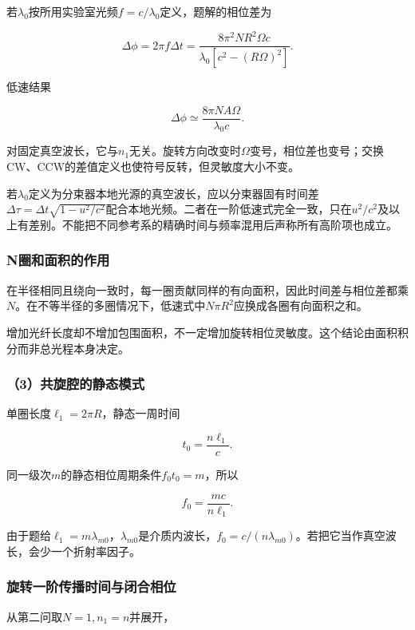 \documentclass[12pt,a4paper,fontset=fandol]{ctexart}
\begin{document}
若\(\lambda_0\)按所用实验室光频\(f=c/\lambda_0\)定义，题解的相位差为

\[
\boxed{
\Delta\phi=2\pi f\Delta t
=\frac{8\pi^2NR^2\Omega c}
{\lambda_0[c^2-(R\Omega)^2]}}.
\]

低速结果

\[
\boxed{
\Delta\phi\simeq
\frac{8\pi N A\Omega}{\lambda_0c}}.
\]

对固定真空波长，它与\(n_1\)无关。旋转方向改变时\(\Omega\)变号，相位差也变号；交换CW、CCW的差值定义也使符号反转，但灵敏度大小不变。

若\(\lambda_0\)定义为分束器本地光源的真空波长，应以分束器固有时间差\(\Delta\tau=\Delta t\sqrt{1-u^2/c^2}\)配合本地光频。二者在一阶低速式完全一致，只在\(u^2/c^2\)及以上有差别。不能把不同参考系的精确时间与频率混用后声称所有高阶项也成立。

\subsubsection{N圈和面积的作用}\label{nux5708ux548cux9762ux79efux7684ux4f5cux7528}

在半径相同且绕向一致时，每一圈贡献同样的有向面积，因此时间差与相位差都乘\(N\)。在不等半径的多圈情况下，低速式中\(N\pi R^2\)应换成各圈有向面积之和。

增加光纤长度却不增加包围面积，不一定增加旋转相位灵敏度。这个结论由面积积分而非总光程本身决定。

\subsubsection{（3）共旋腔的静态模式}\label{ux5171ux65cbux8154ux7684ux9759ux6001ux6a21ux5f0f}

单圈长度\(\ell_1=2\pi R\)，静态一周时间

\[
t_0=\frac{n\ell_1}{c}.
\]

同一级次\(m\)的静态相位周期条件\(f_0t_0=m\)，所以

\[
f_0=\frac{mc}{n\ell_1}.
\]

由于题给\(\ell_1=m\lambda_{m0}\)，\(\lambda_{m0}\)是介质内波长，\(f_0=c/(n\lambda_{m0})\)。若把它当作真空波长，会少一个折射率因子。

\subsubsection{旋转一阶传播时间与闭合相位}\label{ux65cbux8f6cux4e00ux9636ux4f20ux64adux65f6ux95f4ux4e0eux95edux5408ux76f8ux4f4d}

从第二问取\(N=1,n_1=n\)并展开，
\end{document}
